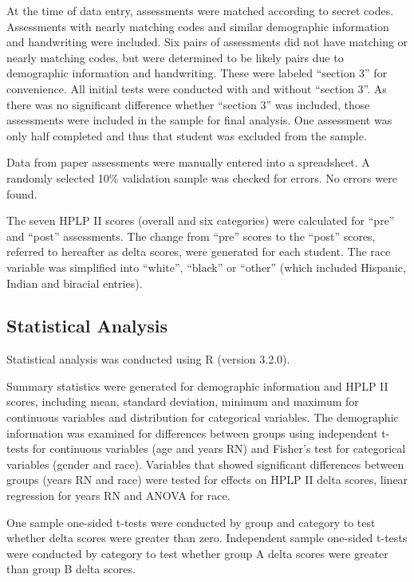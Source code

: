 \documentclass[]{article}
\begin{document}
At the time of data entry, assessments were matched according to secret
codes. Assessments with nearly matching codes and similar demographic
information and handwriting were included. Six pairs of assessments did
not have matching or nearly matching codes, but were determined to be
likely pairs due to demographic information and handwriting. These were
labeled ``section 3'' for convenience. All initial tests were conducted
with and without ``section 3''. As there was no significant difference
whether ``section 3'' was included, those assessments were included in
the sample for final analysis. One assessment was only half completed
and thus that student was excluded from the sample.

Data from paper assessments were manually entered into a spreadsheet. A
randomly selected 10\% validation sample was checked for errors. No
errors were found.

The seven HPLP II scores (overall and six categories) were calculated
for ``pre'' and ``post'' assessments. The change from ``pre'' scores to
the ``post'' scores, referred to hereafter as delta scores, were
generated for each student. The race variable was simplified into
``white'', ``black'' or ``other'' (which included Hispanic, Indian and
biracial entries).

\subsection{Statistical Analysis}\label{statistical-analysis}

Statistical analysis was conducted using R (version 3.2.0).

Summary statistics were generated for demographic information and HPLP
II scores, including mean, standard deviation, minimum and maximum for
continuous variables and distribution for categorical variables. The
demographic information was examined for differences between groups
using independent t-tests for continuous variables (age and years RN)
and Fisher's test for categorical variables (gender and race). Variables
that showed significant differences between groups (years RN and race)
were tested for effects on HPLP II delta scores, linear regression for
years RN and ANOVA for race.

One sample one-sided t-tests were conducted by group and category to
test whether delta scores were greater than zero. Independent sample
one-sided t-tests were conducted by category to test whether group A
delta scores were greater than group B delta scores.
\end{document}

